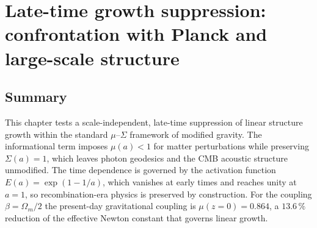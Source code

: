 
\chapter{Late-time growth suppression: confrontation with Planck and large-scale structure}\label{ch:latetime}

\section*{Summary}
This chapter tests a scale-independent, late-time suppression of linear structure growth within the standard $\mu$--$\Sigma$ framework of
modified gravity. The informational term imposes $\mu(a)<1$ for matter perturbations while preserving $\Sigma(a)=1$, which leaves photon geodesics
and the CMB acoustic structure unmodified. The time dependence is governed by the activation function $E(a)=\exp(1-1/a)$, which vanishes at early
times and reaches unity at $a=1$, so recombination-era physics is preserved by construction. For the coupling $\beta=\Omega_m/2$ the present-day
gravitational coupling is $\mu(z{=}0)=0.864$, a $13.6\,\%$ reduction of the effective Newton constant that governs linear growth.

